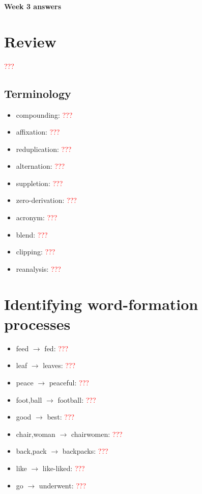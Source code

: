 \documentclass[a4paper,11pt]{article}
\begin{document}
\begin{center}
\Large{\textbf{Week 3 answers}}
\end{center}


\section{Review}

\textcolor{red}{???}



\subsection{Terminology}

\begin{itemize}
\item compounding: \textcolor{red}{???}
\item affixation: \textcolor{red}{???}
\item reduplication: \textcolor{red}{???}
\item alternation: \textcolor{red}{???}
\item suppletion: \textcolor{red}{???}
\item zero-derivation: \textcolor{red}{???}
\item acronym: \textcolor{red}{???}
\item blend: \textcolor{red}{???}
\item clipping: \textcolor{red}{???}
\item reanalysis: \textcolor{red}{???}
\end{itemize}


\section{Identifying word-formation processes}

\begin{itemize}
\item feed $\rightarrow$ fed: \textcolor{red}{???}
\item leaf $\rightarrow$ leaves: \textcolor{red}{???}
\item peace $\rightarrow$ peaceful: \textcolor{red}{???}
\item foot,ball $\rightarrow$ football: \textcolor{red}{???}
\item good $\rightarrow$ best: \textcolor{red}{???}
\item chair,woman $\rightarrow$ chairwomen: \textcolor{red}{???}
\item back,pack $\rightarrow$ backpacks: \textcolor{red}{???}
\item like $\rightarrow$ like-liked: \textcolor{red}{???}
\item go $\rightarrow$ underwent: \textcolor{red}{???}
\end{itemize}
\end{document}
